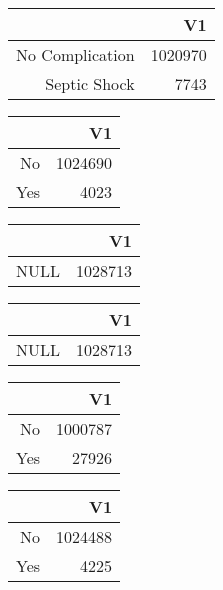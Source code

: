 \bigskip\bigskip
\centering
\begin{tabular}{rr}
  \hline
 & V1 \\ 
  \hline
No Complication & 1020970 \\ 
  Septic Shock & 7743 \\ 
   \hline
\end{tabular}

\bigskip\bigskip
\centering
\begin{tabular}{rr}
  \hline
 & V1 \\ 
  \hline
No & 1024690 \\ 
  Yes & 4023 \\ 
   \hline
\end{tabular}

\bigskip\bigskip
\centering
\begin{tabular}{rr}
  \hline
 & V1 \\ 
  \hline
NULL & 1028713 \\ 
   \hline
\end{tabular}

\bigskip\bigskip
\centering
\begin{tabular}{rr}
  \hline
 & V1 \\ 
  \hline
NULL & 1028713 \\ 
   \hline
\end{tabular}

\bigskip\bigskip
\centering
\begin{tabular}{rr}
  \hline
 & V1 \\ 
  \hline
No & 1000787 \\ 
  Yes & 27926 \\ 
   \hline
\end{tabular}

\bigskip\bigskip
\centering
\begin{tabular}{rr}
  \hline
 & V1 \\ 
  \hline
No & 1024488 \\ 
  Yes & 4225 \\ 
   \hline
\end{tabular}

